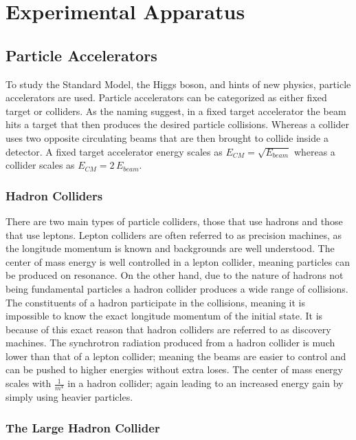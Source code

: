 \chapter{Experimental Apparatus}


\section{Particle Accelerators}

	To study the Standard Model, the Higgs boson, and hints of new physics, particle accelerators are used. Particle accelerators can be categorized as either fixed target or colliders. As the naming suggest, in a fixed target accelerator the beam hits a target that then produces the desired particle collisions. Whereas a collider uses two opposite circulating beams that are then brought to collide inside a detector. A fixed target accelerator energy scales as $E_{CM} = \sqrt{E_{beam}}$ whereas a collider scales as $E_{CM} = 2 \, E_{beam}$. 

	\subsection{Hadron Colliders}

		There are two main types of particle colliders, those that use hadrons and those that use leptons. Lepton colliders are often referred to as precision machines, as the longitude momentum is known and backgrounds are well understood. The center of mass energy is well controlled in a lepton collider, meaning particles can be produced on resonance. On the other hand, due to the nature of hadrons not being fundamental particles a hadron collider produces a wide range of collisions. The constituents of a hadron participate in the collisions, meaning it is impossible to know the exact longitude momentum of the initial state. It is because of this exact reason that hadron colliders are referred to as discovery machines. The synchrotron radiation produced from a hadron collider is much lower than that of a lepton collider; meaning the beams are easier to control and can be pushed to higher energies without extra loses. The center of mass energy scales with $\frac{1}{m^4}$ in a hadron collider; again leading to an increased energy gain by simply using heavier particles.

	\subsection{The Large Hadron Collider}

